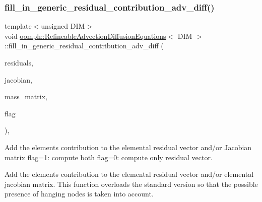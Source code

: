 \mbox{\label{classoomph_1_1RefineableAdvectionDiffusionEquations_aa42c5000c45380b8370565fac3990320}} 
\subsubsection{\texorpdfstring{fill\+\_\+in\+\_\+generic\+\_\+residual\+\_\+contribution\+\_\+adv\+\_\+diff()}{fill\_in\_generic\_residual\_contribution\_adv\_diff()}}
{\footnotesize\ttfamily template$<$unsigned D\+IM$>$ \\
void \hyperlink{classoomph_1_1RefineableAdvectionDiffusionEquations}{oomph\+::\+Refineable\+Advection\+Diffusion\+Equations}$<$ D\+IM $>$\+::fill\+\_\+in\+\_\+generic\+\_\+residual\+\_\+contribution\+\_\+adv\+\_\+diff (\begin{DoxyParamCaption}\item[{\hyperlink{classoomph_1_1Vector}{Vector}$<$ double $>$ \&}]{residuals,  }\item[{\hyperlink{classoomph_1_1DenseMatrix}{Dense\+Matrix}$<$ double $>$ \&}]{jacobian,  }\item[{\hyperlink{classoomph_1_1DenseMatrix}{Dense\+Matrix}$<$ double $>$ \&}]{mass\+\_\+matrix,  }\item[{unsigned}]{flag }\end{DoxyParamCaption})\hspace{0.3cm}{\ttfamily [protected]}, {\ttfamily [virtual]}}



Add the element\textquotesingle{}s contribution to the elemental residual vector and/or Jacobian matrix flag=1\+: compute both flag=0\+: compute only residual vector. 

Add the element\textquotesingle{}s contribution to the elemental residual vector and/or elemental jacobian matrix. This function overloads the standard version so that the possible presence of hanging nodes is taken into account. 

